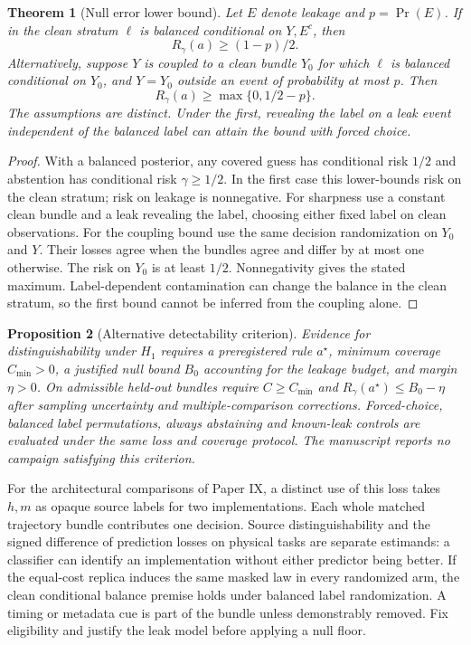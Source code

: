 \documentclass[11pt,a4paper]{article}
\newtheorem{theorem}{Theorem}[section]
\newtheorem{proposition}[theorem]{Proposition}
\begin{document}
\begin{theorem}[Null error lower bound]\label{thm:null-forced}
Let $E$ denote leakage and $p=\Pr(E)$. If in the clean stratum $\ell$ is balanced conditional on $Y,E^c$, then
\[
 R_\gamma(a)\ge(1-p)/2.
\]
Alternatively, suppose $Y$ is coupled to a clean bundle $Y_0$ for which $\ell$ is balanced conditional on $Y_0$, and $Y=Y_0$ outside an event of probability at most $p$. Then
\[
 R_\gamma(a)\ge\max\{0,1/2-p\}.
\]
The assumptions are distinct. Under the first, revealing the label on a leak event independent of the balanced label can attain the bound with forced choice.
\end{theorem}
\begin{proof}
With a balanced posterior, any covered guess has conditional risk $1/2$ and abstention has conditional risk $\gamma\ge1/2$. In the first case this lower-bounds risk on the clean stratum; risk on leakage is nonnegative. For sharpness use a constant clean bundle and a leak revealing the label, choosing either fixed label on clean observations. For the coupling bound use the same decision randomization on $Y_0$ and $Y$. Their losses agree when the bundles agree and differ by at most one otherwise. The risk on $Y_0$ is at least $1/2$. Nonnegativity gives the stated maximum. Label-dependent contamination can change the balance in the clean stratum, so the first bound cannot be inferred from the coupling alone.
\end{proof}

\begin{proposition}[Alternative detectability criterion]
Evidence for distinguishability under $H_1$ requires a preregistered rule $a^\star$, minimum coverage $C_{\min}>0$, a justified null bound $B_0$ accounting for the leakage budget, and margin $\eta>0$. On admissible held-out bundles require $C\ge C_{\min}$ and $R_\gamma(a^\star)\le B_0-\eta$ after sampling uncertainty and multiple-comparison corrections. Forced-choice, balanced label permutations, always abstaining and known-leak controls are evaluated under the same loss and coverage protocol. The manuscript reports no campaign satisfying this criterion.
\end{proposition}


For the architectural comparisons of Paper IX, a distinct use of this loss
takes $h,m$ as opaque source labels for two implementations. Each whole
matched trajectory bundle contributes one decision. Source distinguishability
and the signed difference of prediction losses on physical tasks are
separate estimands: a classifier can identify an implementation without
either predictor being better. If the equal-cost replica induces the same
masked law in every randomized arm, the clean conditional balance premise
holds under balanced label randomization. A timing or metadata cue is part
of the bundle unless demonstrably removed. Fix eligibility and justify the
leak model before applying a null floor.
\end{document}
